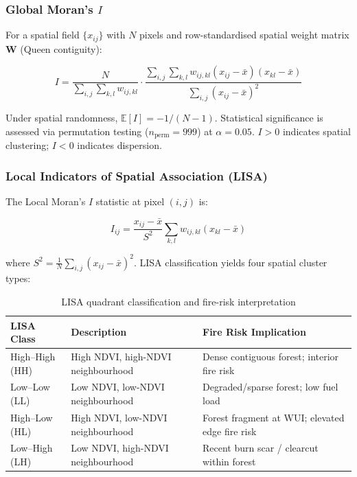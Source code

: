 \documentclass[12pt, a4paper]{article}
\begin{document}
\subsubsection{Global Moran's $I$}
\label{sec:global_moran}

For a spatial field $\{x_{ij}\}$ with $N$ pixels and row-standardised
spatial weight matrix $\mathbf{W}$ (Queen contiguity):

\begin{equation}
    I = \frac{N}{\displaystyle\sum_{i,j}\sum_{k,l} w_{ij,kl}}
    \cdot
    \frac{\displaystyle\sum_{i,j}\sum_{k,l}
          w_{ij,kl}
          \left(x_{ij} - \bar{x}\right)
          \left(x_{kl} - \bar{x}\right)}
         {\displaystyle\sum_{i,j}\left(x_{ij} - \bar{x}\right)^{2}}
    \label{eq:global_morans_i}
\end{equation}

Under spatial randomness, $\mathbb{E}[I] = -1/(N-1)$. Statistical
significance is assessed via permutation testing ($n_{\text{perm}} = 999$)
at $\alpha = 0.05$. $I > 0$ indicates spatial clustering; $I < 0$
indicates dispersion.

\subsubsection{Local Indicators of Spatial Association (LISA)}
\label{sec:lisa}

The Local Moran's $I$ statistic at pixel $(i,j)$ is:

\begin{equation}
    I_{ij} =
    \frac{x_{ij} - \bar{x}}{S^{2}}
    \sum_{k,l} w_{ij,kl}\left(x_{kl} - \bar{x}\right)
    \label{eq:local_morans_i}
\end{equation}

where $S^{2} = \tfrac{1}{N}\sum_{i,j}(x_{ij} - \bar{x})^{2}$.
LISA classification yields four spatial cluster types:

\begin{table}[H]
\centering
\caption{LISA quadrant classification and fire-risk interpretation}
\label{tab:lisa}
\begin{tabular}{@{}lll@{}}
\toprule
\textbf{LISA Class} & \textbf{Description} & \textbf{Fire Risk Implication} \\
\midrule
High--High (HH) & High NDVI, high-NDVI neighbourhood &
    Dense contiguous forest; interior fire risk \\
Low--Low (LL)   & Low NDVI, low-NDVI neighbourhood &
    Degraded/sparse forest; low fuel load \\
High--Low (HL)  & High NDVI, low-NDVI neighbourhood &
    Forest fragment at WUI; elevated edge fire risk \\
Low--High (LH)  & Low NDVI, high-NDVI neighbourhood &
    Recent burn scar / clearcut within forest \\
\bottomrule
\end{tabular}
\end{table}
\end{document}
